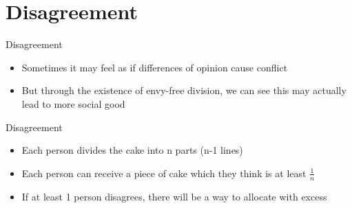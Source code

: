 \documentclass[aspectratio=169,xcolor=dvipsnames]{beamer}
\begin{document}
\section{Disagreement}
\begin{frame}{Disagreement}
	\begin{itemize}
		\item Sometimes it may feel as if differences of opinion cause conflict
		\item But through the existence of envy-free division, we can see this may actually lead to more social good
	\end{itemize}
\end{frame}
\begin{frame}{Disagreement}
	\begin{itemize}
		\item Each person divides the cake into n parts (n-1 lines)
		\item Each person can receive a piece of cake which they think is at least $\frac{1}{n}$ \pause
		\item If at least 1 person disagrees, there will be a way to allocate with excess
	\end{itemize}
\end{frame}
\end{document}

